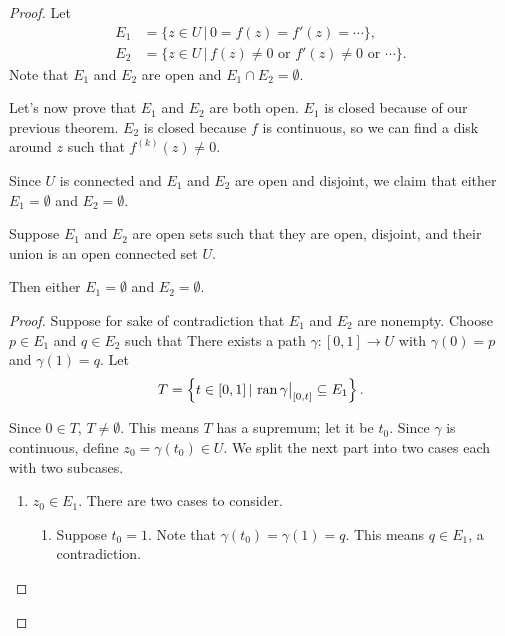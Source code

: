 \documentclass[notes]{subfile}
\begin{document}
\begin{proof}
    Let
    \begin{align*}
        E_1 &= \{ z \in U \, | \, 0 = f(z) = f'(z) = \cdots \}, \\
        E_2 &= \{ z \in U \, | \, f(z) \ne 0 \text{\ or\ }
        f'(z) \ne 0 \text{\ or\ } \cdots \}.
    \end{align*}
    Note that $E_1$ and $E_2$ are open and $E_1 \cap E_2 = \emptyset$.

    \noindent
    Let's now prove that $E_1$ and $E_2$ are both open.
    $E_1$ is closed because of our previous theorem.
    $E_2$ is closed because $f$ is continuous, so we can find
    a disk around $z$ such that $f^{(k)}(z) \ne 0$.

    \noindent
    Since $U$ is connected and $E_1$ and $E_2$ are open and disjoint,
    we claim that either $E_1 = \emptyset$ and $E_2 = \emptyset$.

    \begin{lemma}
        Suppose $E_1$ and $E_2$ are open sets such that they are
        open, disjoint, and their union is an open connected
        set $U$.
        
        \noindent
        Then either $E_1 = \emptyset$ and $E_2 = \emptyset$.
    \end{lemma}

    \begin{proof}
        Suppose for sake of contradiction that $E_1$
        and $E_2$ are nonempty.
        Choose $p \in E_1$ and $q \in E_2$ such that
        There exists a path
        $\gamma : [0,1] \to U$ with $\gamma(0) = p$
        and $\gamma(1) = q$.
        Let
        \[ T = \left\{ t \in [0,1] \, | \, \operatorname{ran}{\gamma\big|_{[0, t]}} 
            \subseteq E_1 \right\}.
        \]

        Since $0 \in T$, $T \ne \emptyset$.  
        This means $T$ has a supremum; let it be $t_0$.
        Since $\gamma$ is continuous, define $z_0 = \gamma(t_0) \in U$.
        We split the next part into two cases each with two
        subcases.
        \begin{enumerate}
            \item $z_0 \in E_1$.  There are two cases to consider.
                \begin{enumerate}
                    \item Suppose $t_0 = 1$.
                        Note that $\gamma(t_0) = \gamma(1) = q$.
                        This means $q \in E_1$, a contradiction.


\end{enumerate}
\end{enumerate}
\end{proof}
\end{proof}
\end{document}
